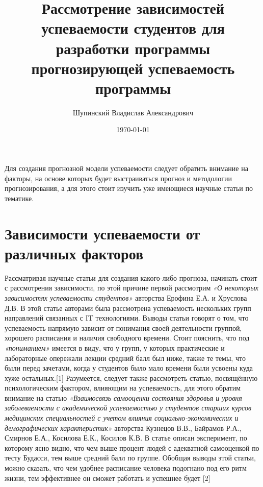 \documentclass{article}
\begin{document}
\title{Рассмотрение зависимостей успеваемости студентов для разработки программы прогнозирующей успеваемость программы}
\author{Шупинский Владислав Александрович}
\date{\today}
\maketitle


Для создания прогнозной модели успеваемости следует обратить внимание на факторы, на основе которых будет выстраиваться прогноз и методологии прогнозирования, а для этого стоит изучить уже имеющиеся научные статьи по тематике.
\section*{Зависимости успеваемости от различных факторов}
Рассматривая научные статьи для создания какого-либо прогноза, начинать стоит с рассмотрения зависимости, по этой причине первой рассмотрим \textit{«О некоторых зависимостях успеваемости студентов»} авторства Ерофина Е.А. и Хруслова Д.В. В этой статье авторами была рассмотрена успеваемость нескольких групп направлений связанных с IT технологиями. Выводы статьи говорят о том, что успеваемость напрямую зависит от понимания своей деятельности группой, хорошего расписания и наличия свободного времени. Стоит пояснить, что под \textit{«пониманием»} имеется в виду, что у групп, у которых практические и лабораторные опережали лекции средний балл был ниже, также те темы, что были перед зачетами, когда у студентов было мало времени были усвоены куда хуже остальных.[1]
Разумеется, следует также рассмотреть статью, посвящённую психологическим фактором, влияющим на успеваемость, для этого обратим внимание на статью \textit{«Взаимосвязь самооценки состояния здоровья и уровня заболеваемости с академической успеваемостью у студентов старших курсов медицинских специальностей с учетом влияния социально-экономических и демографических характеристик»} авторства Кузнецов В.В., Байрамов Р.А., Смирнов Е.А., Косилова Е.К., Косилов К.В. В статье описан эксперимент, по которому ясно видно, что чем выше процент людей с адекватной самооценкой по тесту Будасси, тем выше средний балл по группе. Обобщая выводы этой статьи, можно сказать, что чем удобнее расписание человека подогнано под его ритм жизни, тем эффективнее он сможет работать и успешнее будет [2]
\end{document}
